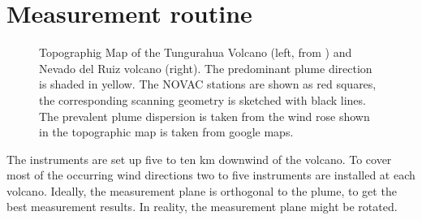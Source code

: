 		\section{Measurement routine}
		\begin{figure}[h]
			\hspace*{-0.8cm}
			\caption[Topographig Map of the Tungurahua Volcano ( from \cite{hidalgo2015so2}) and Nevado del Ruiz volcano]{Topographig Map of the Tungurahua Volcano (left, from \cite{hidalgo2015so2}) and Nevado del Ruiz volcano (right). The predominant plume direction is shaded in yellow.  The NOVAC stations are shown as red squares, the corresponding scanning geometry is sketched with black lines. The prevalent plume dispersion is taken from the wind rose shown in \citet{Windrose} the topographic map is taken from google maps.}
		\label{fig:maptungurahua2}
	\end{figure}
	
		The instruments are set up five to ten km downwind of the volcano. To cover most of the occurring wind directions two to five instruments are installed at each volcano. Ideally, the measurement plane is orthogonal to the plume, to get the best measurement results. In reality, the measurement plane might be rotated.\\
		
